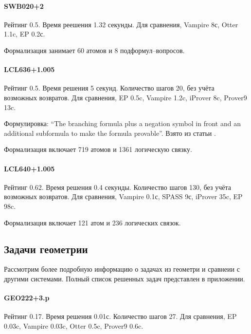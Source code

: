 \paragraph{SWB020+2}
Рейтинг 0.5. Время реешения 1.32 секунды. Для сравнения, Vampire 8с, Otter 1.1c, EP 0.2с.

Формализация занимает 60 атомов и 8 подформул--вопросов.

\paragraph{LCL636+1.005}
Рейтинг 0.5. Время решения 5 секунд. Количество шагов 20, без учёта возможных возвратов. Для сравнения, EP 0.5c, Vampire 1.2c, iProver 8c, Prover9 13c.

Формулировка: ``The branching formula plus a negation symbol in front and an additional subformula to make the formula provable''.
Взято из статьи \cite{SourceLCL}.

Формализация включает 719 атомов и 1361 логическую связку.


\paragraph{LCL640+1.005}
Рейтинг 0.62. Время решения 0.4 секунды. Количество шагов 130, без учёта возможных возвратов. Для сравнения, Vampire 0.1с, SPASS 9с, iProver 35c, EP 98c.

Формализация включает 121 атом и 236 логических связок.


\subsection{Задачи геометрии}
Рассмотрим более подробную информацию о задачах из геометри и сравнеии с другими системами. Полный список решенных задач представлен в приложении.

\paragraph{GEO222+3.p}
Рейтинг 0.17. Время решения 0.01с. Количество шагов 27. Для сравнения, EP 0.03c, Vampire 0.03c, Otter 0.5c, Prover9 0.6c.

